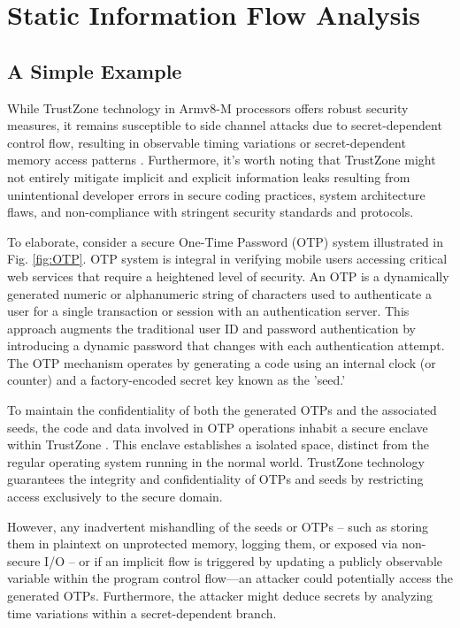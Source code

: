 \section{Static Information Flow Analysis} \label{sect:design}
%
\subsection{A Simple Example}

While TrustZone technology in Armv8-M processors offers robust security measures, it remains susceptible to side channel attacks due to secret-dependent control flow, resulting in observable timing variations or secret-dependent memory access patterns \cite{armdeveloper}. Furthermore, it's worth noting that TrustZone might not entirely mitigate implicit and explicit information leaks resulting from unintentional developer errors in secure coding practices, system architecture flaws, and non-compliance with stringent security standards and protocols.

To elaborate, consider a secure One-Time Password (\ac{OTP}) system illustrated in Fig. \ref{fig:OTP}. \ac{OTP} system is integral in verifying mobile users accessing critical web services that require a heightened level of security. An \ac{OTP} is a dynamically generated numeric or alphanumeric string of characters used to authenticate a user for a single transaction or session with an authentication server. This approach augments the traditional user ID and password authentication by introducing a dynamic password that changes with each authentication attempt. The \ac{OTP} mechanism operates by generating a code using an internal clock (or counter) and a factory-encoded secret key known as the 'seed.' 

To maintain the confidentiality of both the generated \acp{OTP} and the
associated seeds, the code and data involved in \ac{OTP} operations inhabit
a secure enclave within TrustZone \cite{trustotp}. This enclave establishes
a isolated space, distinct from the regular operating system running in the
normal world. TrustZone technology guarantees the integrity and
confidentiality of \acp{OTP} and seeds by restricting access exclusively to the secure domain.

However, any inadvertent mishandling of the seeds or \acp{OTP} -- such as
storing them in plaintext on unprotected memory, logging them, or exposed
via non-secure I/O -- or if an implicit flow is triggered by updating a
publicly observable variable within the program control flow—an attacker
could potentially access the generated \acp{OTP}. Furthermore, the attacker might deduce secrets by analyzing time variations within a secret-dependent branch.

